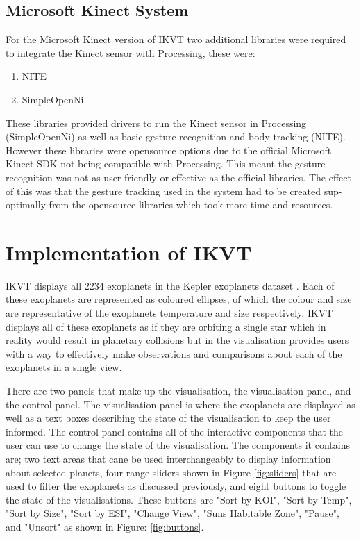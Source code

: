 \subsection{Microsoft Kinect System}
For the Microsoft Kinect version of IKVT two additional libraries were required
to integrate the Kinect sensor
with Processing, these were:
\begin{enumerate}
 \item NITE \cite{nite}
 \item SimpleOpenNi \cite{simpleopenni}
\end{enumerate}
These libraries provided drivers to run the Kinect sensor in Processing
(SimpleOpenNi) as well
as basic gesture recognition and body tracking (NITE). However these libraries
were
opensource options due to the official Microsoft Kinect SDK not being compatible
with
Processing. This meant the gesture recognition was not as user friendly or
effective as the
official libraries. The effect of this was that the gesture tracking used in the
system had to be created sup-optimally from the opensource libraries which took
more time and resources. 

\section{Implementation of IKVT}

IKVT displays all 2234 exoplanets
in the Kepler exoplanets dataset \cite{dataset}. Each of these exoplanets are
represented as coloured
ellipses, of which the colour and size are representative of the exoplanets
temperature and size respectively. IKVT displays all of these exoplanets as if
they are orbiting a single star which in reality would result in planetary
collisions but in the visualisation provides users with a way to effectively
make observations and comparisons about each of the exoplanets in a single
view. 

There are two panels that make up the visualisation, the visualisation panel,
and the control panel. The visualisation panel is where the exoplanets
are displayed as well as a text boxes describing the state of the visualisation
to
keep the user informed. The control panel contains all of the interactive
components that the user can use to change the state of the visualisation. The
components it contains are; two text areas that cane be used interchangeably to
display information about selected planets, four range sliders shown in Figure 
\ref{fig:sliders} that are used to
filter the exoplanets as discussed previously, and eight buttons to toggle the
state of the visualisations. These buttons are "Sort by KOI", "Sort by Temp",
"Sort by Size", "Sort by ESI", "Change View", "Suns Habitable Zone", "Pause",
and "Unsort" as shown in Figure: \ref{fig:buttons}. 

